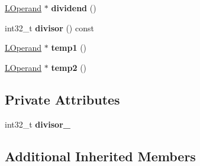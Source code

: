 \begin{DoxyCompactItemize}
\item 
\hyperlink{classv8_1_1internal_1_1_l_operand}{L\+Operand} $\ast$ {\bfseries dividend} ()\hypertarget{classv8_1_1internal_1_1_l_div_by_const_i_aa810bcd07c3b1e6e6fefc71b0125b9fb}{}\label{classv8_1_1internal_1_1_l_div_by_const_i_aa810bcd07c3b1e6e6fefc71b0125b9fb}

\item 
int32\+\_\+t {\bfseries divisor} () const \hypertarget{classv8_1_1internal_1_1_l_div_by_const_i_a54e98ed246800cdb3d19b87abf836d6a}{}\label{classv8_1_1internal_1_1_l_div_by_const_i_a54e98ed246800cdb3d19b87abf836d6a}

\item 
\hyperlink{classv8_1_1internal_1_1_l_operand}{L\+Operand} $\ast$ {\bfseries temp1} ()\hypertarget{classv8_1_1internal_1_1_l_div_by_const_i_af66612b9ebb597ea81860967afc4040c}{}\label{classv8_1_1internal_1_1_l_div_by_const_i_af66612b9ebb597ea81860967afc4040c}

\item 
\hyperlink{classv8_1_1internal_1_1_l_operand}{L\+Operand} $\ast$ {\bfseries temp2} ()\hypertarget{classv8_1_1internal_1_1_l_div_by_const_i_a46fb7a65df1ba0c245d91d753df2e66c}{}\label{classv8_1_1internal_1_1_l_div_by_const_i_a46fb7a65df1ba0c245d91d753df2e66c}

\end{DoxyCompactItemize}
\subsection*{Private Attributes}
\begin{DoxyCompactItemize}
\item 
int32\+\_\+t {\bfseries divisor\+\_\+}\hypertarget{classv8_1_1internal_1_1_l_div_by_const_i_a2d8bc1c50531c5b26134bbfae9742f7e}{}\label{classv8_1_1internal_1_1_l_div_by_const_i_a2d8bc1c50531c5b26134bbfae9742f7e}

\end{DoxyCompactItemize}
\subsection*{Additional Inherited Members}



